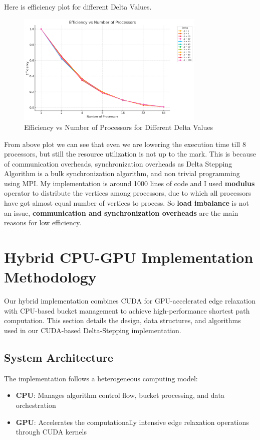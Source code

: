 \documentclass{article}
\begin{document}
\newpage 

Here is efficiency plot for different Delta Values.
\begin{figure}[h]
    \centering
    \includegraphics[width=0.8\textwidth]{efficiency.png}
    \caption{Efficiency vs Number of Processors for Different Delta Values}
    \label{fig:efficiency}
\end{figure}

From above plot we can see that even we are lowering the execution time till 8 processors, but still the resource utilization is not up to the mark. This is because of communication overheads, synchronization overheads as Delta Stepping Algorithm is a bulk synchronization algorithm, and non trivial programming using MPI. My implementation is around 1000 lines of code and I used \textbf{modulus} operator to distribute the vertices among processors, due to which all processors have got almost equal number of vertices to process. So \textbf{load imbalance} is not an issue, \textbf{communication and synchronization overheads} are the main reasons for low efficiency.


\section*{Hybrid CPU-GPU Implementation Methodology}

Our hybrid implementation combines CUDA for GPU-accelerated edge relaxation with CPU-based bucket management to achieve high-performance shortest path computation. This section details the design, data structures, and algorithms used in our CUDA-based Delta-Stepping implementation.

\subsection*{System Architecture}

The implementation follows a heterogeneous computing model:
\begin{itemize}
    \item \textbf{CPU}: Manages algorithm control flow, bucket processing, and data orchestration
    \item \textbf{GPU}: Accelerates the computationally intensive edge relaxation operations through CUDA kernels
\end{itemize}
\end{document}
